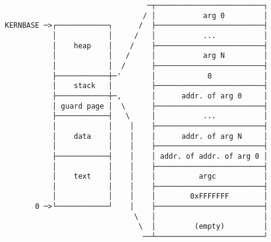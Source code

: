 \documentclass[varwidth,crop]{standalone}
\begin{document}
\begin{verbatim}
                                 ─┬─────────────────────────┐
                                / │           arg 0         │
KERNBASE ─>┌────────────┐      /  ├─────────────────────────┤
           │            │     /   │           ...           │
           │    heap    │    /    ├─────────────────────────┤
           │            │   /     │           arg N         │
           │            │  /      ├─────────────────────────┤
           ├────────────┼─'       │            0            │
           │    stack   │         ├─────────────────────────┤
           ├────────────┼─,       │      addr. of arg 0     │
           │ guard page │  \      ├─────────────────────────┤
           ├────────────┤   \     │           ...           │
           │            │    │    ├─────────────────────────┤
           │    data    │    │    │      addr. of arg N     │
           │            │    │    ├─────────────────────────┤
           ├────────────┤    │    │ addr. of addr. of arg 0 │
           │            │    │    ├─────────────────────────┤
           │    text    │    │    │          argc           │
           │            │    │    ├─────────────────────────┤
           │            │    │    │        0xFFFFFFF        │
       0 ─>└────────────┘    │    ├─────────────────────────┤
                              \   │                         │
                               \  │         (empty)         │
                                ──┴─────────────────────────┘
\end{verbatim}
\end{document}
